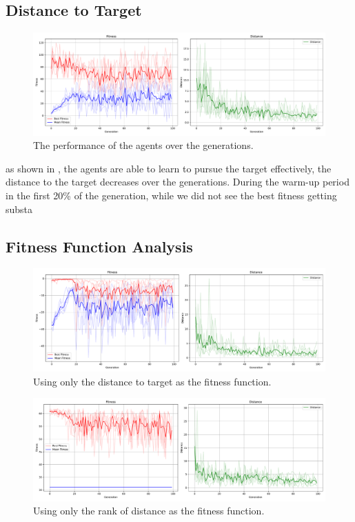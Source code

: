 \documentclass[sigconf]{acmart}
\begin{document}
\subsection{Distance to Target}
\begin{figure}[H]
  \centering
  \includegraphics[width=0.95\linewidth]{imgs/result_Run_cx0.85_mut0.25_2024_1214_0619.pdf}
  \caption{The performance of the agents over the generations.}
  \label{fig:plot_all}
\end{figure}
as shown in , the agents are able to learn to pursue the target effectively, the distance to the target decreases over the generations. During the warm-up period in the first 20\% of the generation, while we did not see the best fitness getting substa
\subsection{Fitness Function Analysis}
\begin{figure}[H]
  \centering
  \includegraphics[width=0.95\linewidth]{imgs/result_Run_cx0.85_mut0.25_2024_1214_0633_dist_only.pdf}
  \caption{Using only the distance to target as the fitness function.}
  \label{fig:plot_dist}
\end{figure}

\begin{figure}[H]
  \centering
  \includegraphics[width=0.95\linewidth]{imgs/result_Run_cx0.85_mut0.25_2024_1214_0634_rank_only.pdf}
  \caption{Using only the rank of distance as the fitness function.}
  \label{fig:plot_rank}
\end{figure}
\end{document}
